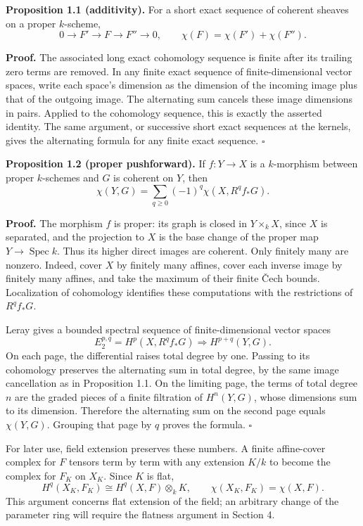 \documentclass[11pt]{article}
\begin{document}
\textbf{Proposition 1.1 (additivity).} For a short exact sequence of
coherent sheaves on a proper \(k\)-scheme, \[
0\longrightarrow F'\longrightarrow F\longrightarrow F''\longrightarrow0,
\qquad \chi(F)=\chi(F')+\chi(F'').
\]

\textbf{Proof.} The associated long exact cohomology sequence is finite
after its trailing zero terms are removed. In any finite exact sequence
of finite-dimensional vector spaces, write each space's dimension as the
dimension of the incoming image plus that of the outgoing image. The
alternating sum cancels these image dimensions in pairs. Applied to the
cohomology sequence, this is exactly the asserted identity. The same
argument, or successive short exact sequences at the kernels, gives the
alternating formula for any finite exact sequence. \(\square\)

\textbf{Proposition 1.2 (proper pushforward).} If \(f:Y\to X\) is a
\(k\)-morphism between proper \(k\)-schemes and \(G\) is coherent on
\(Y\), then \[
\chi(Y,G)=\sum_{q\geq0}(-1)^q\chi(X,R^qf_*G).
\]

\textbf{Proof.} The morphism \(f\) is proper: its graph is closed in
\(Y\times_k X\), since \(X\) is separated, and the projection to \(X\)
is the base change of the proper map \(Y\to\operatorname{Spec}k\). Thus
its higher direct images are coherent. Only finitely many are nonzero.
Indeed, cover \(X\) by finitely many affines, cover each inverse image
by finitely many affines, and take the maximum of their finite Čech
bounds. Localization of cohomology identifies these computations with
the restrictions of \(R^qf_*G\).

Leray gives a bounded spectral sequence of finite-dimensional vector
spaces \[
E_2^{p,q}=H^p(X,R^qf_*G)\Longrightarrow H^{p+q}(Y,G).
\] On each page, the differential raises total degree by one. Passing to
its cohomology preserves the alternating sum in total degree, by the
same image cancellation as in Proposition 1.1. On the limiting page, the
terms of total degree \(n\) are the graded pieces of a finite filtration
of \(H^n(Y,G)\), whose dimensions sum to its dimension. Therefore the
alternating sum on the second page equals \(\chi(Y,G)\). Grouping that
page by \(q\) proves the formula. \(\square\)

For later use, field extension preserves these numbers. A finite
affine-cover complex for \(F\) tensors term by term with any extension
\(K/k\) to become the complex for \(F_K\) on \(X_K\). Since \(K\) is
flat, \[
H^q(X_K,F_K)\cong H^q(X,F)\otimes_k K,
\qquad \chi(X_K,F_K)=\chi(X,F).
\] This argument concerns flat extension of the field; an arbitrary
change of the parameter ring will require the flatness argument in
Section 4.
\end{document}

